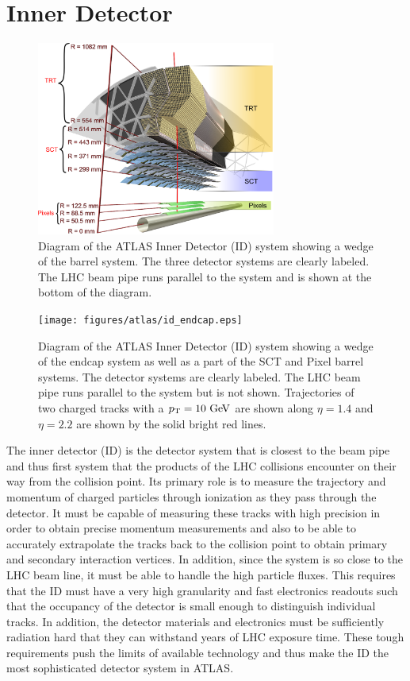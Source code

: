 \section{Inner Detector}
\label{sec:atlas_id}

\begin{figure}[ht!]
\centering
\includegraphics[width=0.7\textwidth]{figures/atlas/id_barrel.eps}
\caption{Diagram of the ATLAS Inner Detector (ID) system showing 
a wedge of the barrel system.  The three detector systems
are clearly labeled. The LHC beam pipe runs parallel to the system
and is shown at the bottom of the diagram.}
\label{fig:atlas_id_barrel}
\end{figure}

\begin{figure}[ht!]
\centering
\texttt{[image: figures/atlas/id\_endcap.eps]}
\caption{Diagram of the ATLAS Inner Detector (ID) system showing 
a wedge of the endcap system as well as a part of the SCT and Pixel
barrel systems.  The detector systems
are clearly labeled.  The LHC beam pipe runs parallel to the system
but is not shown. Trajectories of two charged tracks 
with a $\pt=10\GeV$ are shown along $\eta=1.4$ and $\eta=2.2$ are shown 
by the solid bright red lines.}
\label{fig:atlas_id_endcap}
\end{figure}

The inner detector (ID) is the 
detector system that is closest to the beam pipe and thus
first system that the products of the LHC collisions encounter
on their way from the collision point. Its primary role is 
to measure the trajectory and momentum of charged particles
through ionization as they pass through the detector.
It must be capable of measuring these tracks with high precision
in order to obtain precise momentum measurements and also to be able
to accurately extrapolate the tracks back to the collision point
to obtain primary and secondary interaction vertices. In addition,
since the system is so close to the LHC beam line, it
must be able to handle the high particle fluxes. This requires that
the ID must have a very high granularity and fast electronics
readouts such that the occupancy of the
detector is small enough to distinguish individual tracks. In addition,
the detector materials and electronics must be sufficiently radiation
hard that they can withstand years of LHC exposure time.
These tough requirements push the limits of available technology and thus
make the ID the most sophisticated detector system in ATLAS.



